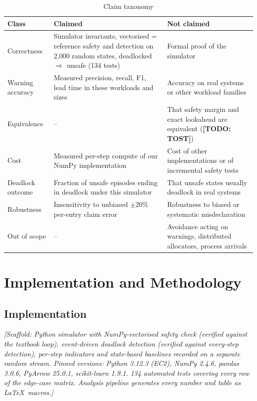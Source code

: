 \documentclass[conference]{IEEEtran}
\newcommand{\scaffold}[1]{\textcolor{blue!60!black}{\textit{[Scaffold: #1]}}}
\newcommand{\todo}[1]{\textcolor{red!70!black}{\textbf{[TODO: #1]}}}
\begin{document}
\begin{table}[t]
\centering\footnotesize
\caption{Claim taxonomy}
\label{tab:claims}
\begin{tabular}{>{\raggedright\arraybackslash}p{1.6cm}>{\raggedright\arraybackslash}p{2.9cm}>{\raggedright\arraybackslash}p{2.9cm}}
\toprule
Class & Claimed & Not claimed \\
\midrule
Correctness & Simulator invariants, vectorised = reference safety and detection on 2,000 random states, deadlocked $\Rightarrow$ unsafe (134 tests) & Formal proof of the simulator \\
Warning accuracy & Measured precision, recall, F1, lead time in these workloads and sizes & Accuracy on real systems or other workload families \\
Equivalence & -- & That safety margin and exact lookahead are equivalent (\todo{TOST}) \\
Cost & Measured per-step compute of our NumPy implementation & Cost of other implementations or of incremental safety tests \\
Deadlock outcome & Fraction of unsafe episodes ending in deadlock under this simulator & That unsafe states usually deadlock in real systems \\
Robustness & Insensitivity to unbiased $\pm$20\% per-entry claim error & Robustness to biased or systematic misdeclaration \\
Out of scope & -- & Avoidance acting on warnings, distributed allocators, process arrivals \\
\bottomrule
\end{tabular}
\end{table}

\section{Implementation and Methodology}\label{sec:method}

\subsection{Implementation}\label{sec:impl}
\scaffold{Python simulator with NumPy-vectorised safety check (verified against the textbook loop), event-driven deadlock detection (verified against every-step detection), per-step indicators and state-based baselines recorded on a separate random stream. Pinned versions: Python 3.12.3 (EC2), NumPy 2.4.6, pandas 3.0.6, PyArrow 25.0.1, scikit-learn 1.9.1. 134 automated tests covering every row of the edge-case matrix. Analysis pipeline generates every number and table as \LaTeX\ macros.}
\end{document}
